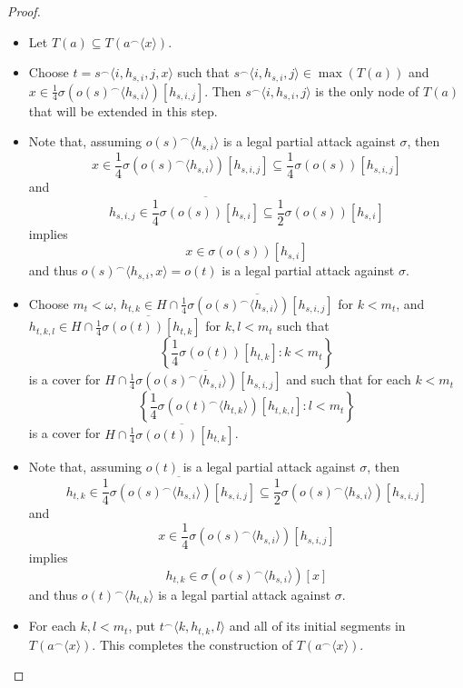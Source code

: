 \documentclass{amsart}
\theoremstyle{definition}
\theoremstyle{remark}
\newcommand{\<}{\langle}
\renewcommand{\>}{\rangle}
\newcommand{\cl}[1]{\overline{#1}}
\newcommand{\concat}{^\frown}
\begin{document}
\begin{proof}
  \begin{itemize}
    \item Let $T(a)\subseteq T(a\concat\<x\>)$.
    \item Choose $t=s\concat\<i,h_{s,i},j,x\>$ such that $s\concat\<i,h_{s,i},j\>\in\max(T(a))$ and $x\in \frac{1}{4}\sigma(o(s)\concat\<h_{s,i}\>)[h_{s,i,j}]$.  Then $s\concat\<i,h_{s,i},j\>$ is the only node of $T(a)$ that will be extended in this step.
    \item Note that, assuming $o(s)\concat\<h_{s,i}\>$ is a legal partial attack against $\sigma$, then
      \[
        x
          \in
        \frac{1}{4}\sigma(o(s)\concat\<h_{s,i}\>)[h_{s,i,j}]
          \subseteq
        \frac{1}{4}\sigma(o(s))[h_{s,i,j}]
      \]
    and
      \[
        h_{s,i,j}
          \in
        \cl{\frac{1}{4}\sigma(o(s))[h_{s,i}]}
          \subseteq
        \frac{1}{2}\sigma(o(s))[h_{s,i}]
      \]
    implies
      \[
        x
          \in
        \sigma(o(s))[h_{s,i}]
      \]
    and thus $o(s)\concat\<h_{s,i},x\>=o(t)$ is a legal partial attack against $\sigma$.
    \item Choose $m_t<\omega$, $h_{t,k}\in H\cap \cl{\frac{1}{4}\sigma(o(s)\concat\<h_{s,i}\>)[h_{s,i,j}]}$ for $k<m_t$, and $h_{t,k,l}\in H\cap\cl{\frac{1}{4}\sigma(o(t))[h_{t,k}]}$ for $k,l<m_t$ such that
      \[
        \left\{\frac{1}{4}\sigma(o(t))[h_{t,k}]:k<m_t\right\}
      \]
    is a cover for $H\cap \cl{\frac{1}{4}\sigma(o(s)\concat\<h_{s,i}\>)[h_{s,i,j}]}$ and such that for each $k<m_t$
      \[
        \left\{\frac{1}{4}\sigma(o(t)\concat\<h_{t,k}\>)[h_{t,k,l}]:l<m_t\right\}
      \]
    is a cover for $H\cap\cl{\frac{1}{4}\sigma(o(t))[h_{t,k}]}$.
    \item Note that, assuming $o(t)$ is a legal partial attack against $\sigma$, then
      \[
        h_{t,k}
          \in
        \cl{\frac{1}{4}\sigma(o(s)\concat\<h_{s,i}\>)[h_{s,i,j}]}
          \subseteq
        \frac{1}{2}\sigma(o(s)\concat\<h_{s,i}\>)[h_{s,i,j}]
      \]
    and
      \[
        x
          \in
        \frac{1}{4}\sigma(o(s)\concat\<h_{s,i}\>)[h_{s,i,j}]
      \]
    implies
      \[
        h_{t,k}
          \in
        \sigma(o(s)\concat\<h_{s,i}\>)[x]
      \]
    and thus $o(t)\concat\<h_{t,k}\>$ is a legal partial attack against $\sigma$.
    \item For each $k,l<m_t$, put $t\concat\<k,h_{t,k},l\>$ and all of its initial segments in $ T(a\concat\<x\>)$.   This completes the construction of  $ T(a\concat\<x\>)$.

    \bigskip


\end{itemize}
\end{proof}
\end{document}
